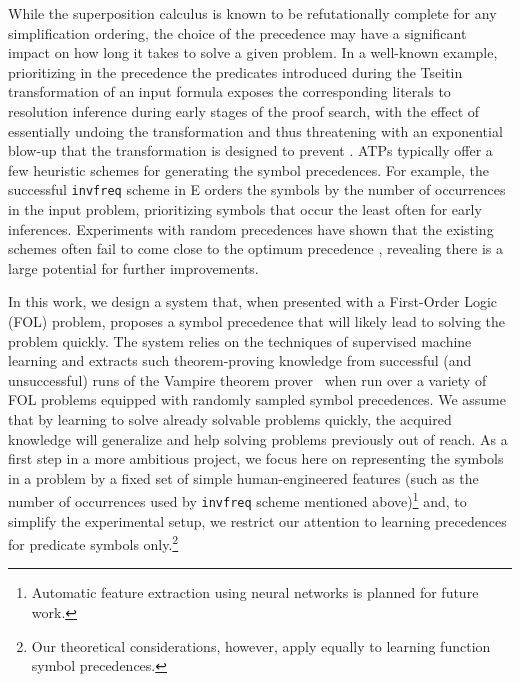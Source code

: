 \documentclass[a4paper]{easychair}
\begin{document}
While the superposition calculus is known \cite{DBLP:journals/logcom/BachmairG94} to be refutationally complete for any simplification ordering, the choice of the precedence may have a significant impact on how long it takes to solve a given problem.
In a well-known example, prioritizing in the precedence the predicates introduced during the Tseitin transformation of an input formula \cite{Tseitin1983} exposes the corresponding literals to resolution inference during early stages of the proof search,
with the effect of essentially undoing the transformation and thus threatening with an exponential blow-up
that the transformation is designed to prevent \cite{Reger2016}.
%
ATPs typically offer a few heuristic schemes for generating the symbol precedences.
For example, the successful \texttt{invfreq} scheme in E \cite{E-manual} orders the symbols by the number of occurrences in the input problem,
prioritizing symbols that occur the least often for early inferences.
Experiments with random precedences have shown that the existing schemes often fail to come close to the optimum precedence \cite{RegerSuda2017}, revealing there is a large potential for further improvements.

In this work, we design a system that, when presented with a First-Order Logic (FOL) problem,
proposes a symbol precedence that will likely lead to solving the problem quickly.
The system relies on the techniques of supervised machine learning and extracts
such theorem-proving knowledge from successful (and unsuccessful) runs of 
the Vampire theorem prover~\cite{Kovacs2013} when run over a variety of FOL problems equipped
with randomly sampled symbol precedences. 
We assume that by learning to solve already solvable problems quickly,
the acquired knowledge will generalize and help solving problems previously out of reach.
As a first step in a more ambitious project,
we focus here on representing the symbols in a problem by a fixed set of simple human-engineered features
(such as the number of occurrences used by \texttt{invfreq} scheme mentioned above)\footnote{Automatic
feature extraction using neural networks is planned for future work.}
and, to simplify the experimental setup, we restrict our attention to learning precedences for predicate symbols only.\footnote{Our theoretical considerations, however, apply equally to learning function symbol precedences.}
\end{document}
